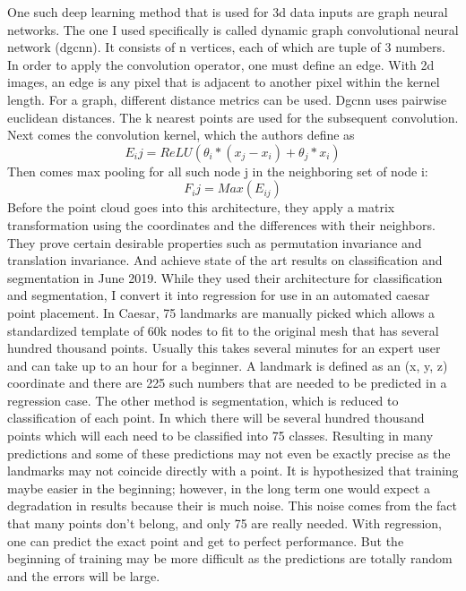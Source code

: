 One such deep learning method that is used for 3d data inputs are graph neural networks. The one I used specifically is called dynamic graph convolutional neural network (dgcnn). It consists of n vertices, each of which are tuple of 3 numbers. In order to apply the convolution operator, one must define an edge. With 2d images, an edge is any pixel that is adjacent to another pixel within the kernel length. For a graph, different distance metrics can be used. Dgcnn uses pairwise euclidean distances. The k nearest points are used for the subsequent convolution. Next comes the convolution kernel, which the authors define as
\begin{equation}
	E_ij = ReLU(\theta_i * (x_j - x_i) + \theta_j * x_i)
\end{equation}
Then comes max pooling for all such node j in the neighboring set of node i:
\begin{equation}
F_ij = Max(E_{ij})
\end{equation}
Before the point cloud goes into this architecture, they apply a matrix transformation using the coordinates and the differences with their neighbors.
They prove certain desirable properties such as permutation invariance and translation invariance. And achieve state of the art results on classification and segmentation in June 2019.
While they used their architecture for classification and segmentation, I convert it into regression for use in an automated caesar point placement. In Caesar, 75 landmarks are manually picked which allows a standardized template of 60k nodes to fit to the original mesh that has several hundred thousand points. Usually this takes several minutes for an expert user and can take up to an hour for a beginner.
A landmark is defined as an (x, y, z) coordinate and there are 225 such numbers that are needed to be predicted in a regression case. The other method is segmentation, which is reduced to classification of each point. In which there will be several hundred thousand points which will each need to be classified into 75 classes. Resulting in many predictions and some of these predictions may not even be exactly precise as the landmarks may not coincide directly with a point. It is hypothesized that training maybe easier in the beginning; however, in the long term one would expect a degradation in results because their is much noise. This noise comes from the fact that many points don't belong, and only 75 are really needed. With regression, one can predict the exact point and get to perfect performance. But the beginning of training may be more difficult as the predictions are totally random and the errors will be large.

